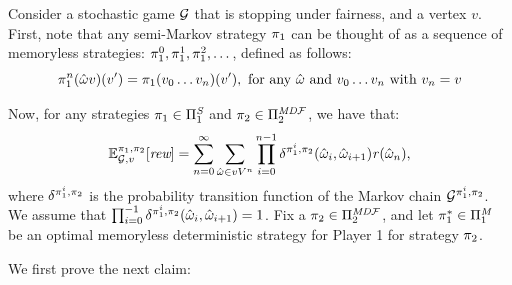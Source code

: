 \begin{myproof}
  Consider a stochastic game $\mathcal{G}$ that is stopping under fairness, and a vertex $v$. First, note that any semi-Markov strategy $\pi_{1}$ can be thought of as a  sequence of memoryless strategies: $\pi_{1}^{0},\pi_{1}^{1},\pi_{1}^{2}, \dots$,  defined as follows:
  \begin{equation}\label{eq:def-memoryless-strat-for-semimarkov}
    \pi_{1}^{n}(\hat{\omega}v)(v') = \pi_{1}(v_0 \dots v_n)(v'), \text{ for any $\hat{\omega}$ and $v_0 \dots v_n$ with $v_n = v$}
  \end{equation}

  Now,  for any strategies $\pi_{1} \in \Pi^{\textit{S}}_{1}$ and $\pi_{2} \in \Pi^{\textit{MD}\mathcal{F}}_{2}$, we have that:
  \[
  \mathbb{E}^{\pi_{1}, \pi_{2}}_{\mathcal{G},v}[\textit{rew}] = 
  \sum^\infty_{n=0} \sum_{\hat{\omega} \in vV^n} \prod^{n-1}_{i=0} \delta^{\pi_{1}^i,\pi_{2}}(\hat{\omega}_i, \hat{\omega}_{i+1}) \mathit{r}(\hat{\omega}_n),
  \]
  where $\delta^{\pi_{1}^i,\pi_{2}}$ is the probability transition function of the Markov chain $\mathcal{G}^{\pi_{1}^i,\pi_{2}}$.  We assume that $\prod^{-1}_{i=0} \delta^{\pi_{1}^i,\pi_{2}}(\hat{\omega}_i, \hat{\omega}_{i+1}) = 1$.
%
  Fix a $\pi_{2} \in \Pi^{\textit{MD}\mathcal{F}}_{2}$, and let $\pi^*_{1} \in \Pi^{\textit{M}}_{1}$ be an optimal memoryless deterministic strategy for Player 1  for strategy $\pi_{2}$.

  We first prove the next claim:


\end{myproof}

